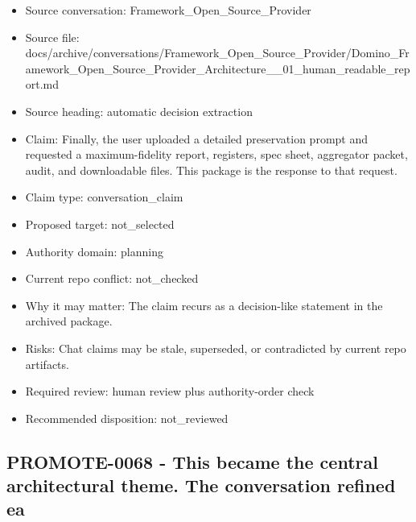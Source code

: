 \documentclass[11pt,a4paper]{report}
\begin{document}
\begin{itemize}
\item Source conversation: Framework\_Open\_Source\_Provider
\item Source file: docs/archive/conversations/Framework\_Open\_Source\_Provider/Domino\_Framework\_Open\_Source\_Provider\_Architecture\_\_01\_human\_readable\_report.md
\item Source heading: automatic decision extraction
\item Claim: Finally, the user uploaded a detailed preservation prompt and requested a maximum-fidelity report, registers, spec sheet, aggregator packet, audit, and downloadable files. This package is the response to that request.
\item Claim type: conversation\_claim
\item Proposed target: not\_selected
\item Authority domain: planning
\item Current repo conflict: not\_checked
\item Why it may matter: The claim recurs as a decision-like statement in the archived package.
\item Risks: Chat claims may be stale, superseded, or contradicted by current repo artifacts.
\item Required review: human review plus authority-order check
\item Recommended disposition: not\_reviewed
\end{itemize}

\subsection{PROMOTE-0068 - This became the central architectural theme. The conversation refined ea}
\end{document}
